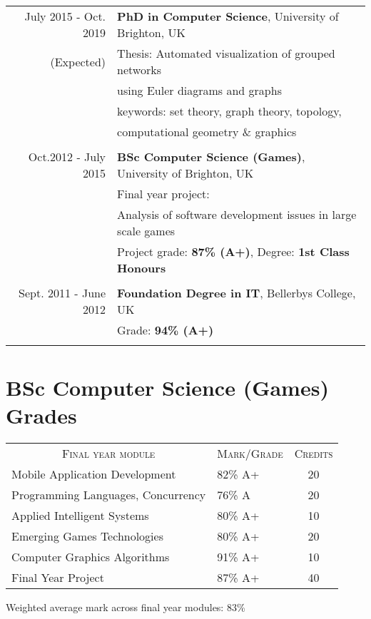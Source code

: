 \documentclass[a4paper,11pt]{article} %
\begin{document}
\begin{tabular}{r|p{11cm}}
July 2015 - Oct. 2019 & \textbf{PhD in Computer Science}, University of Brighton, UK\\
(Expected)& Thesis: Automated visualization of grouped networks\\
& using Euler diagrams and graphs\\
& keywords: set theory, graph theory, topology,\\
& computational geometry \& graphics \\
\multicolumn{2}{c}{} \\

	
Oct.2012 - July 2015 & \textbf{BSc Computer Science (Games)}, University of Brighton, UK\\
& Final year project: \\
& Analysis of software development issues in large scale games\\
&\normalsize Project grade: \textbf{87\% (A+)}, Degree: \textbf{1st Class Honours} \\
\multicolumn{2}{c}{} \\


Sept. 2011 - June 2012 & \textbf{Foundation Degree in IT}, Bellerbys College, UK\\
&\normalsize Grade: \textbf{94\% (A+)} \\
\multicolumn{2}{c}{} \\

\end{tabular}



\section{BSc Computer Science (Games) Grades}

\begin{center}
\begin{tabular}{llc}
\multicolumn{1}{c}{\textsc{Final year module}} & \textsc{Mark/Grade}&\textsc{Credits}\\
Mobile Application Development                                  & 82\% A+ & 20\\
Programming Languages, Concurrency                              & 76\% A & 20\\
Applied Intelligent Systems                                     & 80\% A+ & 10\\
Emerging Games Technologies                                     & 80\% A+ & 20\\
Computer Graphics Algorithms                                    & 91\% A+ & 10\\
Final Year Project                                              & 87\% A+ & 40\\
\end{tabular}
\end{center}
\bigskip
Weighted average mark across final year modules: 83\%
\end{document}
